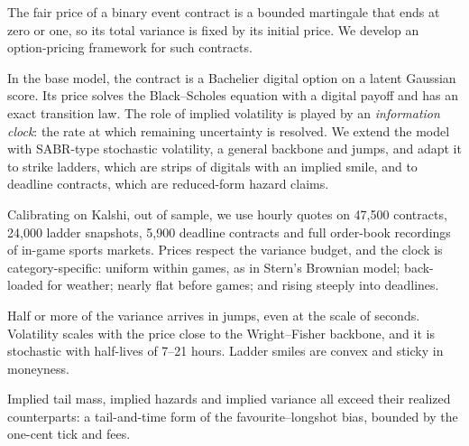The fair price of a binary event contract is a bounded martingale that ends at zero or one, so
its total variance is fixed by its initial price. We develop an option-pricing framework for such
contracts.

In the base model, the contract is a Bachelier digital option on a latent Gaussian score. Its price
solves the Black--Scholes equation with a digital payoff and has an exact transition law. The role
of implied volatility is played by an \emph{information clock}: the rate at which remaining
uncertainty is resolved. We extend the model with SABR-type stochastic volatility, a general
backbone and jumps, and adapt it to strike ladders, which are strips of digitals with an implied
smile, and to deadline contracts, which are reduced-form hazard claims.

Calibrating on Kalshi, out of sample, we use hourly quotes on 47,500 contracts, 24,000 ladder
snapshots, 5,900 deadline contracts and full order-book recordings of in-game sports markets.
Prices respect the variance budget, and the clock is category-specific: uniform within games, as in
Stern's Brownian model; back-loaded for weather; nearly flat before games; and rising steeply into
deadlines.

Half or more of the variance arrives in jumps, even at the scale of seconds. Volatility scales with
the price close to the Wright--Fisher backbone, and it is stochastic with half-lives of 7--21
hours. Ladder smiles are convex and sticky in moneyness.

Implied tail mass, implied hazards and implied variance all exceed their realized counterparts: a
tail-and-time form of the favourite--longshot bias, bounded by the one-cent tick and fees.
